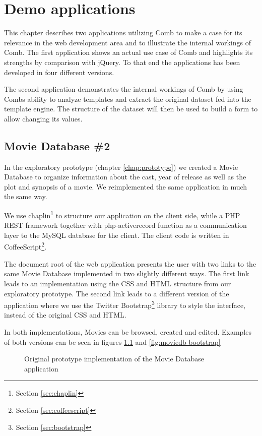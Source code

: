 \documentclass[thesis.tex]{subfiles}
\begin{document}
\chapter{Demo applications}
\label{chap:demo}
This chapter describes two applications utilizing Comb to make a case for
its relevance in the web development area and to illustrate the internal
workings of Comb.
The first application shows an actual use case of Comb and highlights its
strengths by comparison with jQuery. To that end the applications has been
developed in four different versions.

The second application demonstrates the internal workings of Comb by using Combs
ability to analyze templates and extract the original dataset fed into the
template engine. The structure of the dataset will then be used to build a form
to allow changing its values.

\section{Movie Database \#2}
In the exploratory prototype (chapter \ref{chap:prototype}) we created a
Movie Database to organize information about the cast, year of release as well
as the plot and synopsis of a movie. We reimplemented the same application
in much the same way.

We use chaplin\footnote{Section \ref{sec:chaplin}} to structure our
application on the client side, while a PHP REST framework together with
php-activerecord function as a communication layer to the MySQL database for the
client.
The client code is written in CoffeeScript\footnote{Section
\ref{sec:coffeescript}}.

The document root of the web application presents the user with two links to
the same Movie Database implemented in two slightly different ways.
The first link leads to an implementation using the CSS and HTML structure from
our exploratory prototype.
The second link leads to a different version of the application where we use the
Twitter Bootstrap\footnote{Section \ref{sec:bootstrap}} library to style the
interface, instead of the original CSS and HTML.

In both implementations, Movies can be browsed, created and edited. Examples of
both versions can be seen in figures \ref{fig:moviedb-prototype} and
\ref{fig:moviedb-bootstrap}

\begin{figure}
	\centering
	\caption{Original prototype implementation of the Movie Database application}
	\label{fig:moviedb-prototype}
\end{figure}
\end{document}
